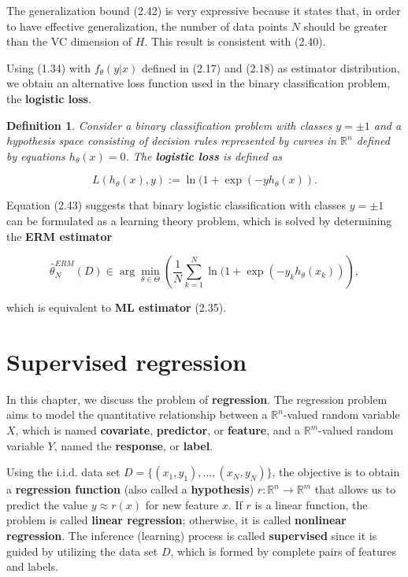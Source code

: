 \documentclass{report}
\newtheorem{definition}{Definition}[chapter]
\begin{document}
The generalization bound (2.42) is very expressive because it states that, in order to have effective generalization, the number of data points $N$ should be greater than the VC dimension of $H$. This result is consistent with (2.40).

Using (1.34) with $f_\theta(y|x)$ defined in (2.17) and (2.18) as estimator distribution, we obtain an alternative loss function used in the binary classification problem, the \textbf{logistic loss}.

\begin{definition}
Consider a binary classification problem with classes $y=\pm 1$ and a hypothesis space consisting of decision rules represented by curves in $\mathbb{R}^n$ defined by equations $h_\theta(x) = 0$. The \textbf{logistic loss} is defined as

\begin{equation}
L(h_\theta(x), y) := \ln(1+\exp(-yh_\theta(x)).
\end{equation}
\end{definition}

Equation (2.43) suggests that binary logistic classification with classes $y=\pm 1$ can be formulated as a learning theory problem, which is solved by determining the \textbf{ERM estimator}

\begin{equation}
\hat{\theta}_N^{ERM}(D) \in \arg \min_{\theta \in \Theta}\left(\frac{1}{N}\sum_{k=1}^N \ln(1+\exp(-y_kh_\theta(x_k))\right),
\end{equation}

which is equivalent to \textbf{ML estimator} (2.35).

\chapter{Supervised regression}
In this chapter, we discuss the problem of \textbf{regression}. The regression problem aims to model the quantitative relationship between a $\mathbb{R}^n$-valued random variable $X$, which is named \textbf{covariate}, \textbf{predictor}, or \textbf{feature}, and a $\mathbb{R}^m$-valued random variable $Y$, named the \textbf{response}, or \textbf{label}.

Using the i.i.d. data set $D = \{(x_1,y_1),\dots,(x_N,y_N)\}$, the objective is to obtain a \textbf{regression function} (also called a \textbf{hypothesis}) $r : \mathbb{R}^n \to \mathbb{R}^m$ that allows us to predict the value $y \approx r(x)$ for new feature $x$. If $r$ is a linear function, the problem is called \textbf{linear regression}; otherwise, it is called \textbf{nonlinear regression}. The inference (learning) process is called \textbf{supervised} since it is guided by utilizing the data set $D$, which is formed by complete pairs of features and labels.
\end{document}
